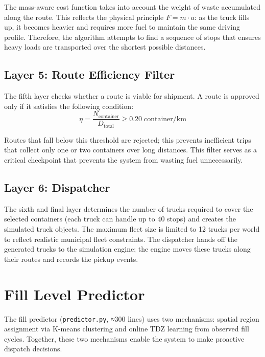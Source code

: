 \documentclass[12pt,a4paper]{report}
\begin{document}
\indent The mass-aware cost function takes into account the weight of waste accumulated along the route. This reflects the physical principle $F = m \cdot a$: as the truck fills up, it becomes heavier and requires more fuel to maintain the same driving profile. Therefore, the algorithm attempts to find a sequence of stops that ensures heavy loads are transported over the shortest possible distances.

\subsection{Layer 5: Route Efficiency Filter}

\indent The fifth layer checks whether a route is viable for shipment. A route is approved only if it satisfies the following condition:
\begin{equation}
  \eta = \frac{N_{\text{container}}}{D_{\text{total}}} \geq 0.20 \;\text{container/km}
  \label{eq:efficiency}
\end{equation}

\indent Routes that fall below this threshold are rejected; this prevents inefficient trips that collect only one or two containers over long distances. This filter serves as a critical checkpoint that prevents the system from wasting fuel unnecessarily.

\subsection{Layer 6: Dispatcher}

\indent The sixth and final layer determines the number of trucks required to cover the selected containers (each truck can handle up to 40 stops) and creates the simulated truck objects. The maximum fleet size is limited to 12 trucks per world to reflect realistic municipal fleet constraints. The dispatcher hands off the generated trucks to the simulation engine; the engine moves these trucks along their routes and records the pickup events.

\section{Fill Level Predictor}

\indent The fill predictor (\texttt{predictor.py}, ≈300 lines) uses two mechanisms: spatial region assignment via K-means clustering and online TDZ learning from observed fill cycles. Together, these two mechanisms enable the system to make proactive dispatch decisions.
\end{document}
